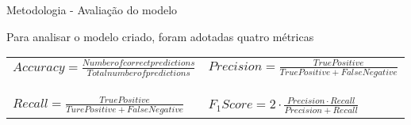 \begin{frame}[t]{Metodologia - Avaliação do modelo}

    \begin{table}[]
        Para analisar o modelo criado, foram adotadas quatro métricas
        \vspace{1cm}
        \centering
        \begin{tabular}{ll}
            \begin{math} Accuracy = \frac{Number of correct predictions}{Total number of predictions} \end{math} 
            &
            \begin{math} Precision = \frac{True Positive}{True Positive + False Negative} \end{math} 
            \\
            &   \\
            &   \\
            &   \\
            \begin{math} Recall = \frac{True Positive}{Ture Positive + False Negative} \end{math}
            &
            \begin{math} F_1Score = 2\cdot\frac{Precision \cdot Recall}{Precision + Recall} \end{math} 
        \end{tabular}
        \end{table}
    
\end{frame}